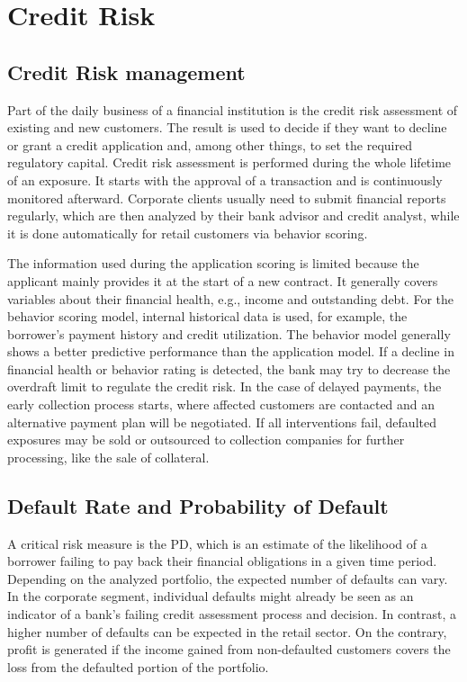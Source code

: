 \chapter{Credit Risk}
\label{ch:CR}

\section{Credit Risk management}
Part of the daily business of a financial institution is the credit risk assessment of existing and new customers. The result is used to decide if they want to decline or grant a credit application and, among other things, to set the required regulatory capital. Credit risk assessment is performed during the whole lifetime of an exposure. It starts with the approval of a transaction and is continuously monitored afterward. Corporate clients usually need to submit financial reports regularly, which are then analyzed by their bank advisor and credit analyst, while it is done automatically for retail customers via behavior scoring. 

The information used during the application scoring is limited because the applicant mainly provides it at the start of a new contract. It generally covers variables about their financial health, e.g., income and outstanding debt. For the behavior scoring model, internal historical data is used, for example, the borrower's payment history and credit utilization. The behavior model generally shows a better predictive performance than the application model. If a decline in financial health or behavior rating is detected, the bank may try to decrease the overdraft limit to regulate the credit risk. In the case of delayed payments, the early collection process starts, where affected customers are contacted and an alternative payment plan will be negotiated. If all interventions fail, defaulted exposures may be sold or outsourced to collection companies for further processing, like the sale of collateral. \cite[p.~7]{Witzany:2017}

\section{Default Rate and Probability of Default}
\label{sec:dr_pd}
A critical risk measure is the \acl{PD}, which is an estimate of the likelihood of a borrower failing to pay back their financial obligations in a given time period. Depending on the analyzed portfolio, the expected number of defaults can vary. In the corporate segment, individual defaults might already be seen as an indicator of a bank's failing credit assessment process and decision. In contrast, a higher number of defaults can be expected in the retail sector. On the contrary, profit is generated if the income gained from non-defaulted customers covers the loss from the defaulted portion of the portfolio. \cite[p.~2]{Witzany:2017}

